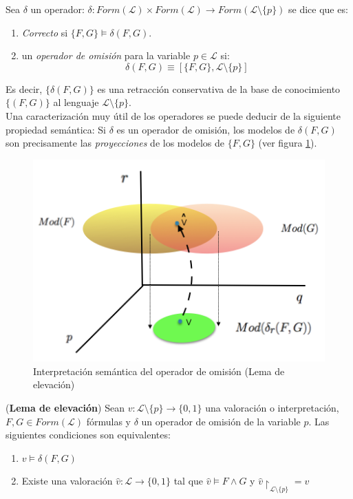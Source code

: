  Sea $\delta$ un operador: $\delta :Form(\mathcal{L}) \times Form(\mathcal{L}) \longrightarrow Form(\mathcal{L} \setminus \{ p \})$  se dice que es:

\begin{enumerate}
\item \textit{Correcto} si $\{F,G\} \vDash \delta (F,G)$.
\item un \textit{operador de omisión} para la variable $p \in \mathcal{L}$ si:
$$\delta (F,G) \equiv [\{F,G\}, \mathcal{L} \setminus \{p\}]$$
\end{enumerate} 

Es decir, $\{ \delta (F,G) \}$ es una retracción conservativa de la base de conocimiento $\{ (F,G) \}$ al lenguaje $\mathcal{L} \setminus \{ p \}$.\\

Una caracterización muy útil de los operadores se puede deducir de la siguiente propiedad semántica: Si  $\delta$ es un operador de omisión, los modelos de $\delta (F,G)$ son precisamente las \textit{proyecciones} de los modelos de $\{ F,G \}$ (ver figura \ref{fig:proy}). 

\begin{figure}[h]
	\centering
		\includegraphics[scale=0.6]{imagenes/indemod.png}
	\caption{Interpretación semántica del operador de omisión (Lema de elevación)}
	\label{fig:proy}
\end{figure}

\lem \label{lem:lifting} (\textbf{Lema de elevación}) Sean $v :\mathcal{L} \setminus \{p\} \rightarrow \{ 0,1 \}$ una valoración o interpretación, $F, G \in Form(\mathcal{L})$ fórmulas y $\delta$ un operador de omisión de la variable $p$. Las siguientes condiciones son equivalentes:
\begin{enumerate}
\item $v \vDash \delta (F,G)$
\item Existe una valoración $\hat{v} : \mathcal{L} \rightarrow \{ 0,1 \}$ tal que $\hat{v} \vDash F \wedge G$ y $\hat{v} \upharpoonright_{\mathcal{L} \setminus \{ p \}} = v $
\end{enumerate}

